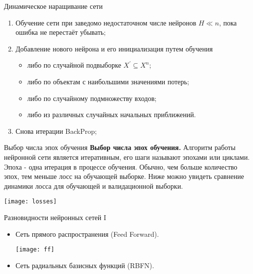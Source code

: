 \documentclass[11pt]{beamer}
\begin{document}
	\begin{frame}{Динамическое наращивание сети}
			\begin{enumerate}
			\item Обучение сети при заведомо недостаточном числе нейронов $H \ll n$, пока ошибка не перестаёт убывать;
			\item Добавление нового нейрона и его инициализация путем обучения 
			\begin{itemize}
				\item либо по случайной подвыборке $X^{'} \subseteq X^n$;
				\item либо по объектам с наибольшими значениями потерь;
				\item либо по случайному подмножеству входов;
				\item либо из различных случайных начальных приближений.
			\end{itemize}
			\item Снова итерации BackProp;
		\end{enumerate}
	\end{frame}

	\begin{frame}{Выбор числа эпох обучения}
		\textbf{Выбор числа эпох обучения.} Алгоритм работы нейронной сети является итеративным, его шаги называют эпохами или циклами. Эпоха - одна итерация в процессе обучения. Обычно, чем больше количество эпох, тем меньше лосс на обучающей выборке.
		Ниже можно увидеть сравнение динамики лосса для обучающей и валидационной выборки.
	
		\begin{center}
			\begin{minipage}{0.51\linewidth}
				\centering
				\texttt{[image: losses]}
			\end{minipage}
		\end{center}

	\end{frame}

	\begin{frame}{Разновидности нейронных сетей I}
		\begin{itemize}
			\item Сеть прямого распространения (Feed Forward).
			\begin{center}
				\begin{minipage}{0.51\linewidth}
					\centering
					\texttt{[image: ff]}
				\end{minipage}
			\end{center}
		
			\item Сеть радиальных базисных функций (RBFN).
						
		\end{itemize}
	\end{frame}
			
\end{document}
